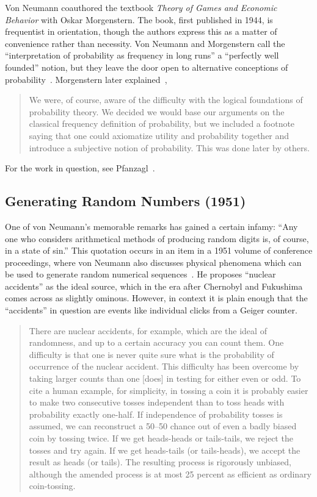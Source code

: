 \documentclass[aps,pra,superscriptaddress,12pt,tightenlines,nofootinbib]{revtex4}
\newcommand{\booktitle}{\textsl}
\begin{document}
Von Neumann coauthored the textbook \booktitle{Theory of Games and
  Economic Behavior} with Oskar Morgenstern.  The book, first
published in 1944, is frequentist in orientation, though the authors
express this as a matter of convenience rather than necessity.  Von
Neumann and Morgenstern call the ``interpretation of probability as
frequency in long runs'' a ``perfectly well founded'' notion, but they
leave the door open to alternative conceptions of
probability~\cite{VN-GAME}.  Morgenstern later
explained~\cite{Morgenstern1976},
\begin{quotation}
\noindent We were, of course, aware of the difficulty with the logical
foundations of probability theory.  We decided we would base our
arguments on the classical frequency definition of probability, but we
included a footnote saying that one could axiomatize utility and
probability together and introduce a subjective notion of
probability.  This was done later by others.
\end{quotation}
For the work in question, see Pfanzagl~\cite{Pfanzagl1959,
  Pfanzagl1967, Pfanzagl1971}.

\subsection{Generating Random Numbers (1951)}

One of von Neumann's memorable remarks has gained a certain infamy:
``Any one who considers arithmetical methods of producing random
digits is, of course, in a state of sin.''  This quotation occurs in
an item in a 1951 volume of conference proceedings, where von Neumann
also discusses physical phenomena which can be used to generate random
numerical sequences~\cite{VN-RAND}.  He proposes ``nuclear accidents''
as the ideal source, which in the era after Chernobyl and Fukushima
comes across as slightly ominous.  However, in context it is plain
enough that the ``accidents'' in question are events like individual
clicks from a Geiger counter.
\begin{quotation}
\noindent There are nuclear accidents, for example, which are the
ideal of randomness, and up to a certain accuracy you can count them.
One difficulty is that one is never quite sure what is the probability
of occurrence of the nuclear accident.  This difficulty has been
overcome by taking larger counts than one [does] in testing for either
even or odd.  To cite a human example, for simplicity, in tossing a
coin it is probably easier to make two consecutive tosses independent
than to toss heads with probability exactly one-half.  If independence
of probability tosses is assumed, we can reconstruct a 50--50 chance
out of even a badly biased coin by tossing twice.  If we get
heads-heads or tails-tails, we reject the tosses and try again.  If we
get heads-tails (or tails-heads), we accept the result as heads (or
tails).  The resulting process is rigorously unbiased, although the
amended process is at most 25 percent as efficient as ordinary
coin-tossing.
\end{quotation}
\end{document}
